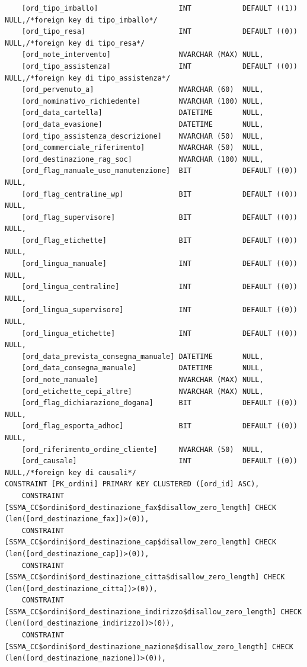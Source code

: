 \documentclass[12pt]{article}
\begin{document}
\begin{lstlisting}
    [ord_tipo_imballo]                   INT            DEFAULT ((1)) NULL,/*foreign key di tipo_imballo*/
    [ord_tipo_resa]                      INT            DEFAULT ((0)) NULL,/*foreign key di tipo_resa*/
    [ord_note_intervento]                NVARCHAR (MAX) NULL,
    [ord_tipo_assistenza]                INT            DEFAULT ((0)) NULL,/*foreign key di tipo_assistenza*/
    [ord_pervenuto_a]                    NVARCHAR (60)  NULL,
    [ord_nominativo_richiedente]         NVARCHAR (100) NULL,
    [ord_data_cartella]                  DATETIME       NULL,
    [ord_data_evasione]                  DATETIME       NULL,
    [ord_tipo_assistenza_descrizione]    NVARCHAR (50)  NULL,
    [ord_commerciale_riferimento]        NVARCHAR (50)  NULL,
    [ord_destinazione_rag_soc]           NVARCHAR (100) NULL,
    [ord_flag_manuale_uso_manutenzione]  BIT            DEFAULT ((0)) NULL,
    [ord_flag_centraline_wp]             BIT            DEFAULT ((0)) NULL,
    [ord_flag_supervisore]               BIT            DEFAULT ((0)) NULL,
    [ord_flag_etichette]                 BIT            DEFAULT ((0)) NULL,
    [ord_lingua_manuale]                 INT            DEFAULT ((0)) NULL,
    [ord_lingua_centraline]              INT            DEFAULT ((0)) NULL,
    [ord_lingua_supervisore]             INT            DEFAULT ((0)) NULL,
    [ord_lingua_etichette]               INT            DEFAULT ((0)) NULL,
    [ord_data_prevista_consegna_manuale] DATETIME       NULL,
    [ord_data_consegna_manuale]          DATETIME       NULL,
    [ord_note_manuale]                   NVARCHAR (MAX) NULL,
    [ord_etichette_cepi_altre]           NVARCHAR (MAX) NULL,
    [ord_flag_dichiarazione_dogana]      BIT            DEFAULT ((0)) NULL,
    [ord_flag_esporta_adhoc]             BIT            DEFAULT ((0)) NULL,
    [ord_riferimento_ordine_cliente]     NVARCHAR (50)  NULL,
    [ord_causale]                        INT            DEFAULT ((0)) NULL,/*foreign key di causali*/
CONSTRAINT [PK_ordini] PRIMARY KEY CLUSTERED ([ord_id] ASC),
    CONSTRAINT [SSMA_CC$ordini$ord_destinazione_fax$disallow_zero_length] CHECK (len([ord_destinazione_fax])>(0)),
    CONSTRAINT [SSMA_CC$ordini$ord_destinazione_cap$disallow_zero_length] CHECK (len([ord_destinazione_cap])>(0)),
    CONSTRAINT [SSMA_CC$ordini$ord_destinazione_citta$disallow_zero_length] CHECK (len([ord_destinazione_citta])>(0)),
    CONSTRAINT [SSMA_CC$ordini$ord_destinazione_indirizzo$disallow_zero_length] CHECK (len([ord_destinazione_indirizzo])>(0)),
    CONSTRAINT [SSMA_CC$ordini$ord_destinazione_nazione$disallow_zero_length] CHECK (len([ord_destinazione_nazione])>(0)),

\end{lstlisting}
\end{document}
